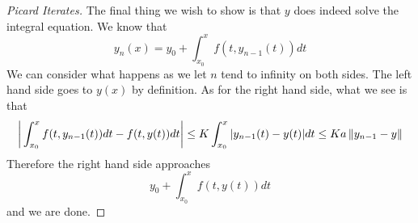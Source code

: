 \begin{proof}[Picard Iterates]
    The final thing we wish to show is that $y$ does indeed solve the integral equation. We know that
    $$ y_n(x) = y_0 + \int_{x_0}^{x} f(t, y_{n - 1}(t)) dt $$
    We can consider what happens as we let $n$ tend to infinity on both sides. The left hand side goes to $y(x)$ by definition. As for the right hand side, what we see is that
    \begin{align*}
        \bigg|\int_{x_0}^{x} f(t, y_{n - 1}(t)) dt - f(t, y(t)) dt \bigg| \leq K \int_{x_0}^{x} |y_{n - 1}(t) - y(t)| dt \leq Ka \left\lVert y_{n - 1} - y\right\rVert
    \end{align*}
    Therefore the right hand side approaches
    $$ y_0 + \int_{x_0}^{x} f(t, y(t)) dt $$
    and we are done.
\end{proof}